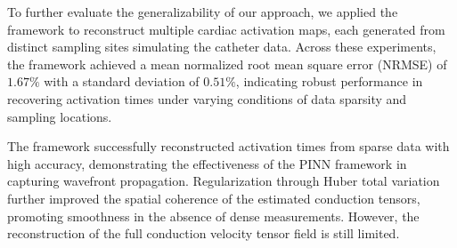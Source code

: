 To further evaluate the generalizability of our approach, we applied the framework to reconstruct multiple cardiac activation maps, each generated from distinct sampling sites simulating the catheter data. Across these experiments, the framework achieved a mean normalized root mean square error (NRMSE) of $1.67\%$ with a standard deviation of $0.51\%$, indicating robust performance in recovering activation times under varying conditions of data sparsity and sampling locations.

The framework successfully reconstructed activation times from sparse data with high accuracy, demonstrating the effectiveness of the PINN framework in capturing wavefront propagation. Regularization through Huber total variation further improved the spatial coherence of the estimated conduction tensors, promoting smoothness in the absence of dense measurements. However, the reconstruction of the full conduction velocity tensor field is still limited.